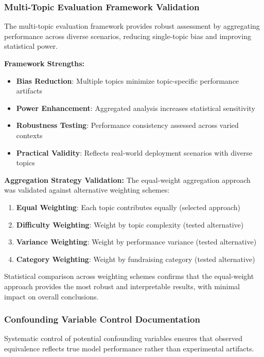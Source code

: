 \subsubsection{Multi-Topic Evaluation Framework Validation}

The multi-topic evaluation framework provides robust assessment by aggregating performance across diverse scenarios, reducing single-topic bias and improving statistical power.

\textbf{Framework Strengths:}
\begin{itemize}
    \item \textbf{Bias Reduction}: Multiple topics minimize topic-specific performance artifacts
    \item \textbf{Power Enhancement}: Aggregated analysis increases statistical sensitivity
    \item \textbf{Robustness Testing}: Performance consistency assessed across varied contexts
    \item \textbf{Practical Validity}: Reflects real-world deployment scenarios with diverse topics
\end{itemize}

\textbf{Aggregation Strategy Validation:}
The equal-weight aggregation approach was validated against alternative weighting schemes:
\begin{enumerate}
    \item \textbf{Equal Weighting}: Each topic contributes equally (selected approach)
    \item \textbf{Difficulty Weighting}: Weight by topic complexity (tested alternative)
    \item \textbf{Variance Weighting}: Weight by performance variance (tested alternative)
    \item \textbf{Category Weighting}: Weight by fundraising category (tested alternative)
\end{enumerate}

Statistical comparison across weighting schemes confirms that the equal-weight approach provides the most robust and interpretable results, with minimal impact on overall conclusions.

\subsubsection{Confounding Variable Control Documentation}

Systematic control of potential confounding variables ensures that observed equivalence reflects true model performance rather than experimental artifacts.

